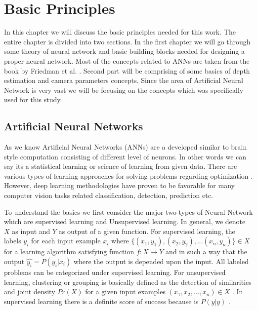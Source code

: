 
\chapter{Basic Principles}
\label{Chapter2:Background} 

In this chapter we will discuss the basic  principles needed for this work. The entire chapter is divided into two sections. In the first chapter we will go through some theory of neural network and basic building blocks  needed for designing a proper neural network. Most of the concepts related to ANNs are taken from the book by Friedman et al. \cite{friedman2001elements}. Second part will be comprising of some basics of depth estimation and camera parameters concepts. Since the area of Artificial Neural Network is very vast we will be focusing on the concepts which was specifically used for this study. 

\section{Artificial Neural Networks}

As we know Artificial Neural Networks (ANNs) are a developed similar to brain style computation consisting of different level of neurons. In other words we can say its a statistical learning or science of learning from given data. There are various types of learning approaches for solving problems regarding optimization . However, deep learning methodologies have proven to be favorable for many computer vision tasks related classification, detection, prediction etc.\cite{friedman2001elements} 

To understand the basics we first consider the major two types of Neural Network which are supervised learning and Unsupervised learning. In general, we denote \(X\) as input and \(Y\) as output of a given function. For supervised learning, the labels \(y_{i}\) for each input example \(x_{i}\) where    \(\{(x_{1},y_{1}),(x_{2},y_{2}),...(x_{n},y_{n})\} \in X\) for a learning algorithm satisfying function \(f:X \rightarrow Y\) and in such a way that the output \( \hat{y_{i}} = P (y_{i}|x_{i})\) where the output is depended upon the input. All labeled problems can be categorized under supervised learning. For  unsupervised learning, clustering or grouping is basically defined as the detection of similarities and joint density \(Pr(X)\) for a given input examples \({(x_{1},x_{2},...,x_{n})} \in X\) . In supervised learning there is a definite score of success because is \(P(y|y)\) \cite{friedman2001elements}. 

